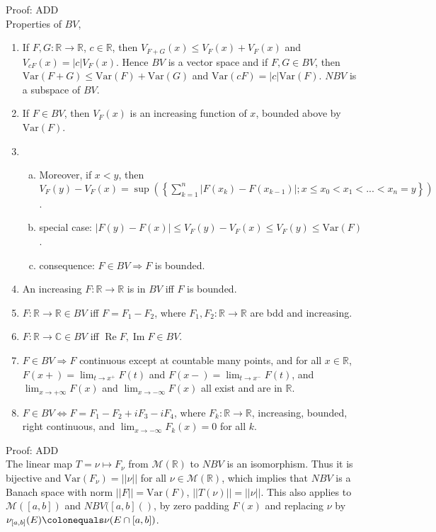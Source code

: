 \documentclass[12pt]{article}
\newcommand{\rimply}[0] { \Rightarrow }
\newcommand{\lrimply}[0] { \Leftrightarrow }
\newcommand{\rarw}[0] { \rightarrow }
\newcommand{ \defeq }[0] { \colonequals }
\renewcommand{\Re}{ \operatorname{Re} }
\renewcommand{\Im}{ \operatorname{Im} }
\newcommand{\reals}[0] { \mathbb{R}}
\newcommand{\complexes}[0] { \mathbb{C}}
\newcommand{\M}[0] { \mathcal{M} }
\newcommand{ \Var } { \textrm{Var} }
\begin{document}
\noindent
Proof: ADD \\


Properties of $BV$,

\begin{enumerate}[1)]
\item
If $F,G: \reals \rarw \reals$, $c \in \reals$, then $V_{F+G}(x) \le V_F(x) + V_F(x)$ and $V_{cF}(x) = |c| V_F(x)$. Hence $BV$ is a vector space and if $F,G \in BV$, then $\Var(F+G) \le \Var(F) + \Var(G)$ and $\Var(cF) = |c| \Var(F)$. $NBV$ is a subspace of $BV$.
\item
If $F \in BV$, then $V_F(x)$ is an increasing function of $x$, bounded above by $\Var(F)$.
\item
\begin{enumerate}[a)]
\item
Moreover, if $x < y$, then $V_F(y)-V_F(x) = \sup \left( \left\{ \sum_{k=1}^n | F(x_k) - F(x_{k-1}) | ; x \le x_0 < x_1 < ... < x_{n} = y \right\} \right)$.
\item
special case: $|F(y) - F(x)| \le V_F(y) - V_F(x) \le V_F(y) \le \Var(F)$.
\item
consequence: $F \in BV \rimply F$ is bounded.
\end{enumerate}
\item
An increasing $F: \reals \rarw \reals$ is in $BV$ iff $F$ is bounded.
\item
$F: \reals \rarw \reals \in BV$ iff $F =  F_1-F_2$, where $F_1,F_2: \reals \rarw \reals$ are bdd and increasing.
\item
$F: \reals \rarw \complexes \in BV$ iff $\Re F, \Im F \in BV$.
\item
$F \in BV \rimply F$ continuous except at countable many points, and for all $x \in \reals$, $F(x+) = \lim_{t \rarw x^+} F(t)$ and $F(x-) = \lim_{t \rarw x^-} F(t)$, and $\lim_{x \rarw +\infty} F(x)$ and $\lim_{x \rarw -\infty} F(x)$ all exist and are in $\reals$.
\item
 $F \in BV \lrimply F = F_1 - F_2 + i F_3 - i F_4$, where $F_k : \reals \rarw \reals$, increasing, bounded, right continuous, and $\lim_{x \rarw - \infty} F_k(x) = 0$ for all $k$.
\end{enumerate}


\noindent
Proof: ADD \\


The linear map $T = \nu \mapsto F_\nu$ from $\M(\reals)$ to $NBV$ is an isomorphism. Thus it is bijective and $\Var(F_\nu) = ||\nu||$ for all $\nu \in \M(\reals)$, which implies that $NBV$ is a Banach space with norm $||F|| = \Var(F)$, $||T(\nu)|| = ||\nu||$.  This also applies to $\M([a,b])$ and $NBV([a,b]()$, by zero padding $F(x)$ and replacing $\nu$ by $\nu_{[a,b]}(E) \defeq \nu(E \cap [a,b])$. \\
\end{document}
